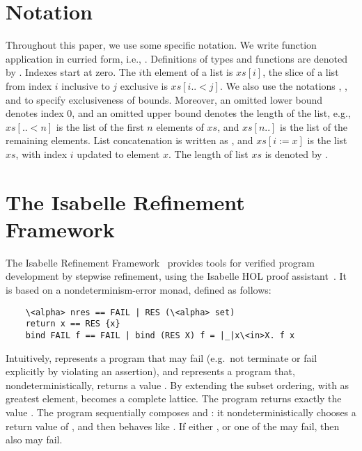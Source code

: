 \documentclass[sigplan,10pt,anonymous,review]{acmart}\settopmatter{printfolios=true,printccs=false,printacmref=false}
\theoremstyle{definition}
\begin{document}

\section{Notation}
  Throughout this paper, we use some specific notation. We write function application in curried form, i.e., .
  Definitions of types and functions are denoted by \is{==}. Indexes start at zero. The \is$i$th element of a list is \is$xs[i]$,
  the slice of a list from index \is$i$ inclusive to \is$j$ exclusive is \is$xs[i..<j]$. We also use the notations , ,
  and  to specify exclusiveness of bounds. Moreover, an omitted lower bound denotes index $0$, and an omitted upper bound denotes
  the length of the list, e.g., \is$xs[..<n]$ is the list of the first \is$n$ elements of $xs$, and \is$xs[n..]$ is the list of the remaining elements.
  List concatenation is written as , and \is$xs[i:=x]$ is the list \is$xs$, with index \is$i$ updated to element \is$x$.
  The length of list \is$xs$ is denoted by .


\section{The Isabelle Refinement Framework}
  The Isabelle Refinement Framework~\cite{LaTu12} provides tools for
  verified program development by stepwise refinement, using the Isabelle HOL proof assistant~\cite{NPW02}.
  It is based on a nondeterminism-error monad, defined as follows:
  \begin{lstlisting}
    \<alpha> nres == FAIL | RES (\<alpha> set)
    return x == RES {x}
    bind FAIL f == FAIL | bind (RES X) f = |_|x\<in>X. f x
  \end{lstlisting}
  Intuitively,  represents a program that may fail (e.g.~not terminate or fail explicitly by violating an assertion),
  and  represents a program that, nondeterministically, returns a value .
  By extending the subset ordering, with  as greatest element,  becomes a complete lattice.
  The program  returns exactly the value .
  The program  sequentially composes  and : it nondeterministically chooses a
  return value  of , and then behaves like . If either , or one of the  may fail,
  then also  may fail.
\end{document}
